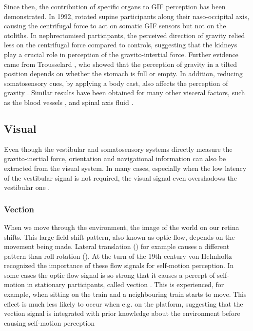 Since then, the contribution of specific organs to GIF perception has been demonstrated. In 1992, \citeauthor{mittelstaedt1992} rotated supine participants along their naso-occipital axis, causing the centrifugal force to act on somatic GIF sensors  but not on the otoliths. In nephrectomised participants, the perceived direction of gravity relied less on the centrifugal force compared to controls, suggesting that the kidneys play a crucial role in perception of the gravito-intertial force. Further evidence came from Trousselard \citeyear{trousselard2004}, who showed that the perception of gravity in a tilted position depends on whether the stomach is full or empty. In addition, reducing somatosensory cues, by applying a body cast, also affects the perception of gravity \cite{trousselard2004}.  Similar results have been obtained for many other visceral factors, such as the blood vessels \cite{vaitl2002}, and spinal axis fluid \cite{vaitl1997}.


\subsection{Visual}
Even though the vestibular and somatosensory systems directly measure the gravito-inertial force, orientation and navigational information can also be extracted from the visual system. In many cases, especially when the low latency of the vestibular signal is not required, the visual signal even overshadows the vestibular one \cite{wright2005,gaerlan2012}.

\subsubsection{Vection}
When we move through the environment, the image of the world on our retina shifts. This large-field shift pattern, also known as optic flow, depends on the movement being made. Lateral translation () for example causes a different pattern than roll rotation (). At the turn of the 19th century von Helmholtz \citeyear{vonhelmholtz1867} recognized the importance of these flow signals for self-motion perception. In some cases the optic flow signal is so strong that it causes a percept of self-motion in stationary participants, called vection \cite{dichgans1978}. This is experienced, for example, when sitting on the train and a neighbouring train starts to move. This effect is much less likely to occur when e.g. on the platform, suggesting that the vection signal is integrated with prior knowledge about the environment before causing self-motion perception \cite{andersen1985,lepecq1995}


